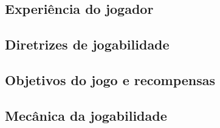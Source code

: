 \documentclass[12pt,a4paper]{article}
\begin{document}
\subsection{Experiência do jogador}


\subsection{Diretrizes de jogabilidade}


\subsection{Objetivos do jogo e recompensas}





\subsection{Mecânica da jogabilidade}

\end{document}
